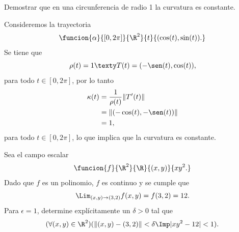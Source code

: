 \documentclass[a4,11pt]{aleph-examen}
\begin{document}
\begin{preguntas}
\item 
    Demostrar que en una circunferencia de radio 1 la curvatura es constante.

\begin{respuesta}
    Consideremos la trayectoria
    \[
        \funcion{\alpha}{[0,2\pi]}{\R^2}{t}{(\cos(t),\sin(t)).}
    \]
    Se tiene que
    \[
        \rho(t)=1
        \texty
        T(t)=(-\sen(t),\cos(t)),
    \]
    para todo $t\in[0,2\pi]$, por lo tanto
    \begin{align*}
        \kappa(t)
            & = \frac{1}{\rho(t)}\|T'(t)\| \\
            & = \|(-\cos(t),-\sen(t))\| \\
            & = 1,
    \end{align*}
    para todo $t\in[0,2\pi]$, lo que implica que la curvatura es constante.

\item 
    Sea el campo escalar
    \[
        \funcion{f}{\R^2}{\R}{(x,y)}{xy^2.}
    \]
    Dado que $f$ es un polinomio, $f$ es continuo y se cumple que
    \[
        \Lim_{(x,y)\to (3,2)}f(x,y)=f(3,2)=12.
    \]
    Para $\epsilon=1$, determine explícitamente un $\delta>0$ tal que
    \[
    (\forall (x,y)\in\R^2)(\|(x,y)-(3,2)\|< \delta \Imp |xy^2-12|<1).
    \]


\end{respuesta}
\end{preguntas}
\end{document}
